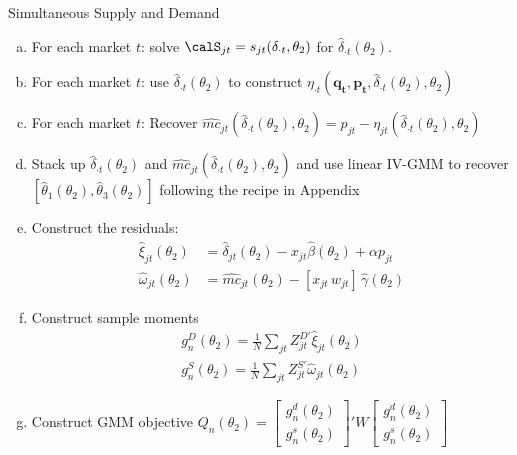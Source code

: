 \begin{frame}{Simultaneous Supply and Demand}
\tiny
\begin{enumerate}[(a)]
\item For each market $t$: solve $\calS_{jt} = s_{jt}(\delta_{\cdot t},\theta_2)$ for $\widehat{\delta}_{\cdot t}(\theta_2)$.
\item For each market $t$: use $\widehat{\delta}_{\cdot t}(\theta_2)$ to construct $\eta_{\cdot 
t}(\symbf{q_t},\symbf{p_t},\widehat{\delta}_{\cdot t}(\theta_2),\theta_2)$
\item For each market $t$: Recover $\widehat{mc}_{jt}(\widehat{\delta}_{\cdot t}(\theta_2),\theta_2) = p_{jt} - \eta_{jt}(\widehat{\delta}_{\cdot t}(\theta_2),\theta_2)$
\item Stack up $\widehat{\delta}_{\cdot t}(\theta_2)$ and $\widehat{mc}_{jt}(\widehat{\delta}_{\cdot t}(\theta_2),\theta_2)$ and use linear IV-GMM to recover $[\widehat{\theta}_1(\theta_2), \widehat{\theta}_3(\theta_2) ]$ following the recipe in Appendix
\item Construct the residuals:
\begin{align*}
\nonumber    \widehat{\xi}_{jt}(\theta_2) &= \widehat{\delta}_{jt}(\theta_2) -  x_{jt} \widehat{\beta}(\theta_2) + \alpha p_{jt}\\
    \widehat{\omega}_{jt}(\theta_2) &= \widehat{mc}_{jt}(\theta_2) -  [x_{jt}\, w_{jt}]\, \widehat{\gamma}(\theta_2)
\end{align*}
\item Construct sample moments
\begin{align*}
\nonumber g_n^D(\theta_2)=\frac{1}{N} \sum_{jt} Z_{jt}^{D\prime} \widehat{\xi}_{jt}(\theta_2)\\
 g_n^S(\theta_2)=\frac{1}{N} \sum_{jt} Z_{jt}^{S \prime} \widehat{\omega}_{jt}(\theta_2)
\end{align*}
\item Construct GMM objective $Q_n(\theta_2)= \left[ {\begin{array}{c} g_n^d(\theta_2) \\ g_n^s(\theta_2) \end{array} } \right]' W  \left[ {\begin{array}{c} g_n^d(\theta_2) \\ g_n^s(\theta_2) \end{array} } \right] $
\end{enumerate}
\end{frame}


